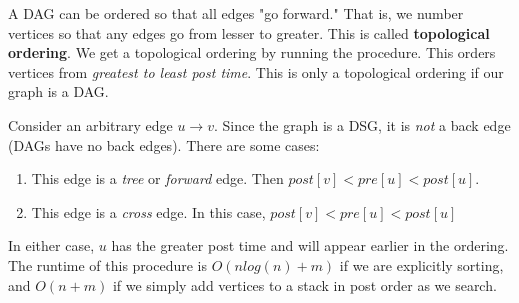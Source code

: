 \documentclass[titlepage, 12pt, leqno]{article}
\begin{document}
A DAG can be ordered so that all edges "go forward." That is, we number vertices
so that any edges go from lesser to greater. This is called \textbf{topological
ordering}. We get a topological ordering by running the 
procedure. This orders vertices from \textit{greatest to least post time}. This is
only a topological ordering if our graph is a DAG.

Consider an arbitrary edge $u \rightarrow v$. Since the graph is a DSG, it is
\textit{not} a back edge (DAGs have no back edges). There are some cases:
\begin{enumerate}
    \item This edge is a \textit{tree} or \textit{forward} edge. Then
        $post[v] < pre[u] < post[u]$.
    \item This edge is a \textit{cross} edge. In this case,
        $post[v] < pre[u] < post[u]$
\end{enumerate}
In either case, $u$ has the greater post time and will appear earlier in the
ordering. The runtime of this procedure is $O(nlog(n) + m)$ if we are explicitly
sorting, and $O(n+m)$ if we simply add vertices to a stack in post order as we
search.
\end{document}
